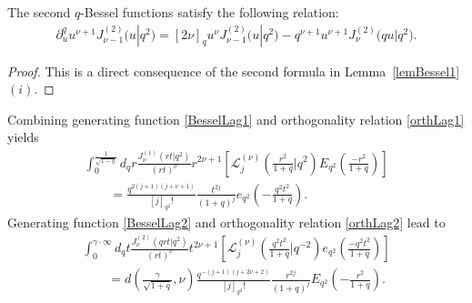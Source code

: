\documentclass[pdftex]{sigma}
\newcommand{\cL}{\mathcal{L}}
\numberwithin{equation}{section}
\begin{document}
\begin{corollary}
\label{lemBesselextra}
The second $q$-Bessel functions satisfy the following relation:
\begin{gather*}
\partial_u^q u^{\nu+1}J_{\nu-1}^{(2)}\big(u|q^2\big) = [2\nu]_qu^\nu J_{\nu-1}^{(2)}\big(u|q^2\big)-q^{\nu+1}u^{\nu+1}J_{\nu}^{(2)}\big(qu|q^2\big).
\end{gather*}
\end{corollary}
\begin{proof}
This is a direct consequence of the second formula in Lemma~\ref{lemBessel1}$(i)$.
\end{proof}




Combining generating function \eqref{BesselLag1} and orthogonality relation \eqref{orthLag1} yields
\begin{gather}
\int_0^{\frac{1}{\sqrt{1-q}}}d_qr \frac{J_\nu^{(1)}(rt|q^2)}{(rt)^{\nu}}r^{2\nu+1}\left[\cL_j^{(\nu)}\left(\frac{r^2}{1+q}|q^2\right)E_{q^2}\left(\frac{-r^2}{1+q}\right)\right]
\nonumber\\
\qquad {} =\frac{q^{2(j+1)(j+\nu+1)}}{[j]_{q^2}!}\frac{t^{2j}}{(1+q)^j}e_{q^2}\left(-\frac{q^2t^2}{1+q}\right).\label{preHank1}
\end{gather}
Generating function \eqref{BesselLag2} and orthogonality relation \eqref{orthLag2} lead to
\begin{gather} \int_0^{\gamma\cdot\infty}d_qt\frac{J_\nu^{(2)}(qrt|q^2)}{(rt)^{\nu}}t^{2\nu+1}\left[\cL_j^{(\nu)}
\left(\frac{q^2t^2}{1+q}|q^{-2}\right)e_{q^2}\left(\frac{-q^2t^2}{1+q}\right)\right]\nonumber\\
\qquad {}= d\left(\frac{\gamma}{\sqrt{1+q}},\nu\right)\frac{q^{-(j+1)(j+2\nu+2)}}{[j]_{q^2}!}\frac{r^{2j}}{(1+q)^j}E_{q^2}
\left(-\frac{r^2}{1+q}\right).\label{preHank2}
\end{gather}
\end{document}
